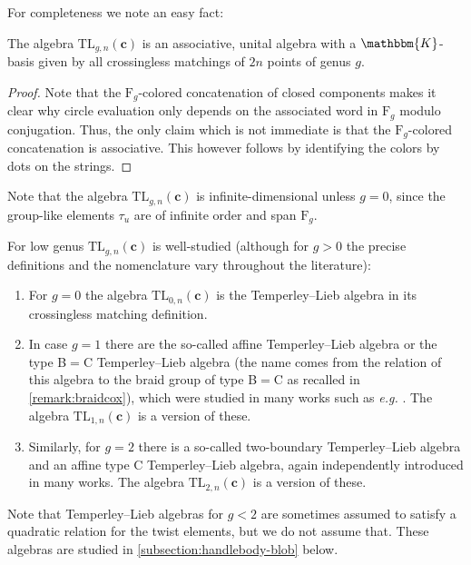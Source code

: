 \documentclass[a4paper,11pt]{amsart}
\newcommand{\eg}{\textsl{e.g.}}
\newcommand{\setstuff}[1]{\mathrm{#1}}
\newcommand{\KK}{\mathbbm{K}}
\newcommand{\bsym}[1]{\boldsymbol{#1}}
\newcommand{\cpar}{\bsym{c}}
\numberwithin{equation}{section}
\let\fullref\autoref
\begin{document}
For completeness we note an easy fact:

\begin{lemma}\label{lemma:tl-basis}
The algebra $\setstuff{TL}_{g,n}(\cpar)$ is an associative, unital 
algebra with a $\KK$-basis given by all crossingless 
matchings of $2n$ points of genus $g$.
\end{lemma}

\begin{proof}
Note that the $\setstuff{F}_{g}$-colored 
concatenation of closed components makes it clear why 
circle evaluation only depends on the associated word in $\setstuff{F}_{g}$ 
modulo conjugation.
Thus, the only claim which is not immediate is 
that the $\setstuff{F}_{g}$-colored 
concatenation is associative. This however follows 
by identifying the colors by dots on the strings.
\end{proof}

Note that the algebra $\setstuff{TL}_{g,n}(\cpar)$ is 
infinite-dimensional unless $g=0$, since the group-like elements $\tau_{u}$ 
are of infinite order and span $\setstuff{F}_{g}$.

\begin{remark}\label{remark:tl}
For low genus $\setstuff{TL}_{g,n}(\cpar)$ is well-studied 
(although for $g>0$ the precise definitions and the 
nomenclature vary 
throughout the literature):
\begin{enumerate}

\setlength\itemsep{0.15cm}

\item For $g=0$ the algebra 
$\setstuff{TL}_{0,n}(\cpar)$ is the 
Temperley--Lieb algebra in its crossingless matching definition.

\item In case $g=1$ there are the so-called 
affine Temperley--Lieb algebra or the
type B$=$C Temperley--Lieb algebra 
(the name comes from the relation of this algebra 
to the braid group of type B$=$C 
as recalled in \fullref{remark:braidcox}), 
which were studied in many works such as {\eg} \cite{GrLe-affine-tl}.
The algebra $\setstuff{TL}_{1,n}(\cpar)$ is a version of these.

\item Similarly, for 
$g=2$ there is a so-called two-boundary 
Temperley--Lieb algebra 
and an affine type C Temperley--Lieb 
algebra, again independently 
introduced in many works.
The algebra $\setstuff{TL}_{2,n}(\cpar)$ 
is a version of these.

\end{enumerate}
Note that Temperley--Lieb algebras for $g<2$
are sometimes assumed to satisfy a quadratic relation for the twist 
elements, but we do not assume that.
These algebras are studied in \fullref{subsection:handlebody-blob} below.
\end{remark}
\end{document}
